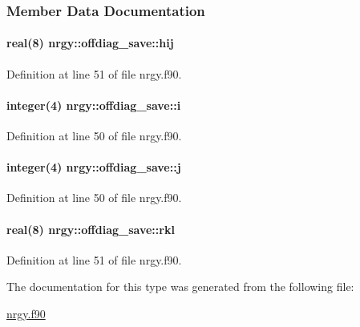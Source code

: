 \subsubsection{Member Data Documentation}
\hypertarget{structnrgy_1_1offdiag__save_a139b09d298932bc09f98634b00c70463}{
\paragraph[{hij}]{\setlength{\rightskip}{0pt plus 5cm}real(8) nrgy\-::offdiag\-\_\-save\-::hij}}\label{structnrgy_1_1offdiag__save_a139b09d298932bc09f98634b00c70463}


Definition at line 51 of file nrgy.\-f90.

\hypertarget{structnrgy_1_1offdiag__save_a84c94de2228adadf40187a2c584c8896}{
\paragraph[{i}]{\setlength{\rightskip}{0pt plus 5cm}integer(4) nrgy\-::offdiag\-\_\-save\-::i}}\label{structnrgy_1_1offdiag__save_a84c94de2228adadf40187a2c584c8896}


Definition at line 50 of file nrgy.\-f90.

\hypertarget{structnrgy_1_1offdiag__save_a8efa92d13904284eeed8fdcaecb274bf}{
\paragraph[{j}]{\setlength{\rightskip}{0pt plus 5cm}integer(4) nrgy\-::offdiag\-\_\-save\-::j}}\label{structnrgy_1_1offdiag__save_a8efa92d13904284eeed8fdcaecb274bf}


Definition at line 50 of file nrgy.\-f90.

\hypertarget{structnrgy_1_1offdiag__save_a839509e8e53fa8d03de15f252066f7e5}{
\paragraph[{rkl}]{\setlength{\rightskip}{0pt plus 5cm}real(8) nrgy\-::offdiag\-\_\-save\-::rkl}}\label{structnrgy_1_1offdiag__save_a839509e8e53fa8d03de15f252066f7e5}


Definition at line 51 of file nrgy.\-f90.



The documentation for this type was generated from the following file\-:\begin{DoxyCompactItemize}
\item 
\hyperlink{nrgy_8f90}{nrgy.\-f90}\end{DoxyCompactItemize}
